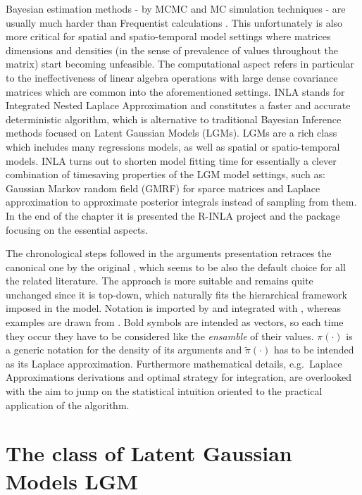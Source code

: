 \documentclass[
  12pt,
  a4paper,
  oneside]{book}
\theoremstyle{definition}
\theoremstyle{definition}
\theoremstyle{definition}
\theoremstyle{remark}
\begin{document}
Bayesian estimation methods - by MCMC \citep{mcmc} and MC simulation techniques - are usually much harder than Frequentist calculations \citep{wang2018bayesian}. This unfortunately is also more critical for spatial and spatio-temporal model settings \citep{Cameletti2012} where matrices dimensions and densities (in the sense of prevalence of values throughout the matrix) start becoming unfeasible.
The computational aspect refers in particular to the ineffectiveness of linear algebra operations with large dense covariance matrices which are common into the aforementioned settings.
INLA \citep{Rue2009} stands for Integrated Nested Laplace Approximation and constitutes a faster and accurate deterministic algorithm, which is alternative \citep{YT:Rue} to traditional Bayesian Inference methods focused on Latent Gaussian Models (LGMs)\citeyearpar{wang2018bayesian}. LGMs are a rich class which includes many regressions models, as well as spatial or spatio-temporal models.
INLA turns out to shorten model fitting time for essentially a clever combination of timesaving properties of the LGM model settings, such as: Gaussian Markov random field (GMRF) for sparce matrices and Laplace approximation to approximate posterior integrals instead of sampling from them.
In the end of the chapter it is presented the R-INLA project and the package focusing on the essential aspects.

The chronological steps followed in the arguments presentation retraces the canonical one by the original \citep{Rue2009}, which seems to be also the default choice for all the related literature. The approach is more suitable and remains quite unchanged since it is top-down, which naturally fits the hierarchical framework imposed in the model.
Notation is imported by \citet{Blangiardo-Cameletti} and integrated with \citet{Bayesian_INLA_Rubio}, whereas examples are drawn from \citet{wang2018bayesian}. Bold symbols are intended as vectors, so each time they occur they have to be considered like the \emph{ensamble} of their values. \(\pi(\cdot)\) is a generic notation for the density of its arguments and \(\tilde\pi(\cdot)\) has to be intended as its Laplace approximation. Furthermore mathematical details, e.g.~Laplace Approximations derivations and optimal strategy for integration, are overlooked with the aim to jump on the statistical intuition oriented to the practical application of the algorithm.

\hypertarget{LGM}{%
\section{The class of Latent Gaussian Models LGM}\label{LGM}}
\end{document}

